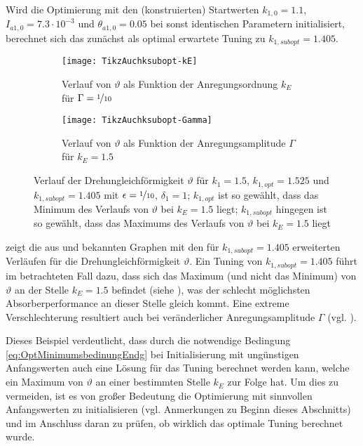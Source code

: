 Wird die Optimierung mit den (konstruierten) Startwerten $k_{1,0}=1.1$, $I_{a1,0}=7.3 \cdot 10^{-3}$ und $\theta_{a1,0}= 0.05$ bei sonst identischen Parametern  initialisiert, berechnet sich 
das zunächst als optimal erwartete Tuning zu $k_{1,subopt} = 1.405$. 	
%
%
\begin{figure}[bt]%
	\centering
	\begin{subfigure}{0.49\textwidth}
	\texttt{[image: TikzAuchksubopt-kE]} \label{fig:Opt:Beispiel:VerlaufVonVarthetaFuerSuboptimalesk1UeberkE}
	\caption{Verlauf von $\vartheta$ als Funktion der Anregungsordnung $k_E$ für $\Gamma = \nicefrac{1}{10}$}
	\end{subfigure}
	\hfill
	\begin{subfigure}{0.49\textwidth}
	\texttt{[image: TikzAuchksubopt-Gamma]} \label{fig:Opt:Beispiel:VerlaufVonVarthetaFuerSuboptimalesk1UeberGamma}
	\caption{Verlauf von $\vartheta$ als Funktion der Anregungsamplitude $\Gamma$ für $k_E = 1.5$}
	\end{subfigure}

	\caption[Verlauf der Drehungleichförmigkeit $\vartheta$ für $k_1=1.5$, $k_{1,opt} = 1.525$]
					{Verlauf der Drehungleichförmigkeit $\vartheta$ für $k_1=1.5$, $k_{1,opt} = 1.525$ und $k_{1,subopt}=1.405$ 
					mit $\epsilon = \nicefrac{1}{10}$,  $\delta_1 = 1$;
					$k_{1,opt}$ ist so gewählt, dass das Minimum des Verlaufs von $\vartheta$ bei $k_E=1.5$ liegt; 
					$k_{1,subopt}$ hingegen ist so gewählt, dass das Maximums des Verlaufs von $\vartheta$ bei $k_E=1.5$ liegt	}
	\label{fig:Opt:Beispiel:VerlaufVonVarthetaFuerSuboptimalesk1}
\end{figure}
%
%
%
 zeigt die aus 	 
und	 bekannten Graphen mit den für $k_{1,subopt}=1.405$  erweiterten
Verläufen für die Drehungleichförmigkeit $\vartheta$. 
Ein Tuning von $k_{1,subopt}=1.405$ führt im betrachteten Fall dazu, dass sich das Maximum  (und nicht das Minimum)
von $\vartheta$ an der Stelle $k_E=1.5$ befindet (siehe ), 
was der schlecht möglichsten Absorberperformance an dieser Stelle gleich kommt. Eine extreme Verschlechterung resultiert auch bei
veränderlicher Anregungsamplitude  $\Gamma$ %
(vgl. ).

Dieses Beispiel verdeutlicht, dass durch die notwendige Bedingung \eqref{eq:OptMinimumsbedinungEndg} bei Initialisierung mit
ungünstigen Anfangswerten auch eine
Lösung für das Tuning berechnet werden kann, welche ein Maximum  von $\vartheta$ an einer bestimmten Stelle $k_E$ zur Folge hat.
Um dies zu vermeiden, ist es von großer Bedeutung die Optimierung mit sinnvollen Anfangswerten zu initialisieren (vgl. Anmerkungen zu Beginn dieses
Abschnitts) und im Anschluss daran zu prüfen, ob wirklich das optimale Tuning berechnet wurde.

